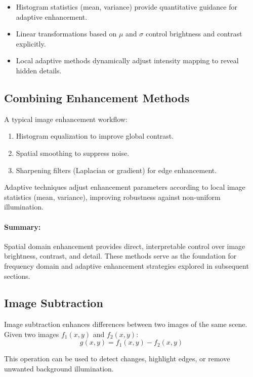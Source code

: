 \documentclass[12pt,a4paper]{AnantDocumentation}
\begin{document}
\begin{itemize}
\item Histogram statistics (mean, variance) provide quantitative guidance for adaptive enhancement.
\item Linear transformations based on $\mu$ and $\sigma$ control brightness and contrast explicitly.
\item Local adaptive methods dynamically adjust intensity mapping to reveal hidden details.
\end{itemize}


\subsection{Combining Enhancement Methods}
A typical image enhancement workflow:
\begin{enumerate}
\item Histogram equalization to improve global contrast.
\item Spatial smoothing to suppress noise.
\item Sharpening filters (Laplacian or gradient) for edge enhancement.
\end{enumerate}

Adaptive techniques adjust enhancement parameters according to local image statistics (mean, variance), improving robustness against non-uniform illumination.

\paragraph{Summary:} Spatial domain enhancement provides direct, interpretable control over image brightness, contrast, and detail. These methods serve as the foundation for frequency domain and adaptive enhancement strategies explored in subsequent sections.

\subsection{Image Subtraction}

Image subtraction enhances differences between two images of the same scene.  
Given two images $f_1(x, y)$ and $f_2(x, y)$:
\begin{equation}
g(x, y) = f_1(x, y) - f_2(x, y)
\end{equation}

This operation can be used to detect changes, highlight edges, or remove unwanted background illumination.
\end{document}
